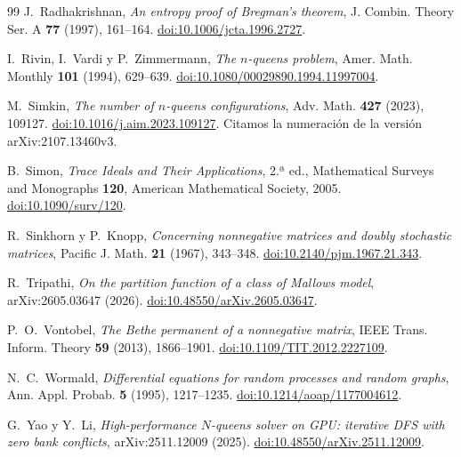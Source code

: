 \begin{thebibliography}{99}
 J.~Radhakrishnan, \emph{An entropy proof of Bregman's theorem},
J. Combin. Theory Ser. A \textbf{77} (1997), 161--164.
\href{https://doi.org/10.1006/jcta.1996.2727}{doi:10.1006/jcta.1996.2727}.

 I.~Rivin, I.~Vardi y P.~Zimmermann, \emph{The $n$-queens problem},
Amer. Math. Monthly \textbf{101} (1994), 629--639.
\href{https://doi.org/10.1080/00029890.1994.11997004}{doi:10.1080/00029890.1994.11997004}.

 M.~Simkin, \emph{The number of $n$-queens configurations}, Adv. Math.
\textbf{427} (2023), 109127.
\href{https://doi.org/10.1016/j.aim.2023.109127}{doi:10.1016/j.aim.2023.109127}. Citamos la numeración de
la versión arXiv:2107.13460v3.

 B.~Simon, \emph{Trace Ideals and Their Applications}, 2.ª ed., Mathematical
Surveys and Monographs \textbf{120}, American Mathematical Society, 2005.
\href{https://doi.org/10.1090/surv/120}{doi:10.1090/surv/120}.

 R.~Sinkhorn y P.~Knopp, \emph{Concerning nonnegative matrices and doubly stochastic
matrices}, Pacific J. Math. \textbf{21} (1967), 343--348.
\href{https://doi.org/10.2140/pjm.1967.21.343}{doi:10.2140/pjm.1967.21.343}.

 R.~Tripathi, \emph{On the partition function of a class of Mallows model},
arXiv:2605.03647 (2026).
\href{https://doi.org/10.48550/arXiv.2605.03647}{doi:10.48550/arXiv.2605.03647}.

 P.~O.~Vontobel, \emph{The Bethe permanent of a nonnegative matrix},
IEEE Trans. Inform. Theory \textbf{59} (2013), 1866--1901.
\href{https://doi.org/10.1109/TIT.2012.2227109}{doi:10.1109/TIT.2012.2227109}.

 N.~C.~Wormald, \emph{Differential equations for random processes and random
graphs}, Ann. Appl. Probab. \textbf{5} (1995), 1217--1235.
\href{https://doi.org/10.1214/aoap/1177004612}{doi:10.1214/aoap/1177004612}.

 G.~Yao y Y.~Li, \emph{High-performance $N$-queens solver on GPU: iterative DFS
with zero bank conflicts}, arXiv:2511.12009 (2025).
\href{https://doi.org/10.48550/arXiv.2511.12009}{doi:10.48550/arXiv.2511.12009}.
\end{thebibliography}
